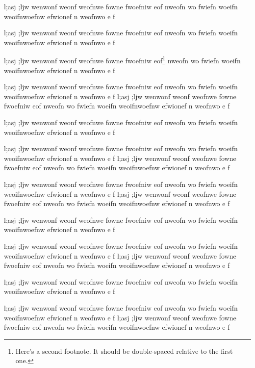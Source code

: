 \documentclass[openany]{book}
\begin{document}
        l;asj ;ljw wenwonf weonf weofnwe fowne fwoefniw eof
        nweofn wo fwiefn woeifn weoifnwoefnw efwionef n weofnwo e f

        l;asj ;ljw wenwonf weonf weofnwe fowne fwoefniw eof
        nweofn wo fwiefn woeifn weoifnwoefnw efwionef n weofnwo e f

        l;asj ;ljw wenwonf weonf weofnwe fowne fwoefniw eof\footnote{
                Here's a second footnote. It should be double-spaced
                relative to the first one.
        }
        nweofn wo fwiefn woeifn weoifnwoefnw efwionef n weofnwo e f

        l;asj ;ljw wenwonf weonf weofnwe fowne fwoefniw eof
        nweofn wo fwiefn woeifn weoifnwoefnw efwionef n weofnwo e f
        l;asj ;ljw wenwonf weonf weofnwe fowne fwoefniw eof
        nweofn wo fwiefn woeifn weoifnwoefnw efwionef n weofnwo e f

        l;asj ;ljw wenwonf weonf weofnwe fowne fwoefniw eof
        nweofn wo fwiefn woeifn weoifnwoefnw efwionef n weofnwo e f

        l;asj ;ljw wenwonf weonf weofnwe fowne fwoefniw eof
        nweofn wo fwiefn woeifn weoifnwoefnw efwionef n weofnwo e f
        l;asj ;ljw wenwonf weonf weofnwe fowne fwoefniw eof
        nweofn wo fwiefn woeifn weoifnwoefnw efwionef n weofnwo e f

        l;asj ;ljw wenwonf weonf weofnwe fowne fwoefniw eof
        nweofn wo fwiefn woeifn weoifnwoefnw efwionef n weofnwo e f
        l;asj ;ljw wenwonf weonf weofnwe fowne fwoefniw eof
        nweofn wo fwiefn woeifn weoifnwoefnw efwionef n weofnwo e f

        l;asj ;ljw wenwonf weonf weofnwe fowne fwoefniw eof
        nweofn wo fwiefn woeifn weoifnwoefnw efwionef n weofnwo e f

        l;asj ;ljw wenwonf weonf weofnwe fowne fwoefniw eof
        nweofn wo fwiefn woeifn weoifnwoefnw efwionef n weofnwo e f
        l;asj ;ljw wenwonf weonf weofnwe fowne fwoefniw eof
        nweofn wo fwiefn woeifn weoifnwoefnw efwionef n weofnwo e f

        l;asj ;ljw wenwonf weonf weofnwe fowne fwoefniw eof
        nweofn wo fwiefn woeifn weoifnwoefnw efwionef n weofnwo e f

        l;asj ;ljw wenwonf weonf weofnwe fowne fwoefniw eof
        nweofn wo fwiefn woeifn weoifnwoefnw efwionef n weofnwo e f
        l;asj ;ljw wenwonf weonf weofnwe fowne fwoefniw eof
        nweofn wo fwiefn woeifn weoifnwoefnw efwionef n weofnwo e f
\end{document}
